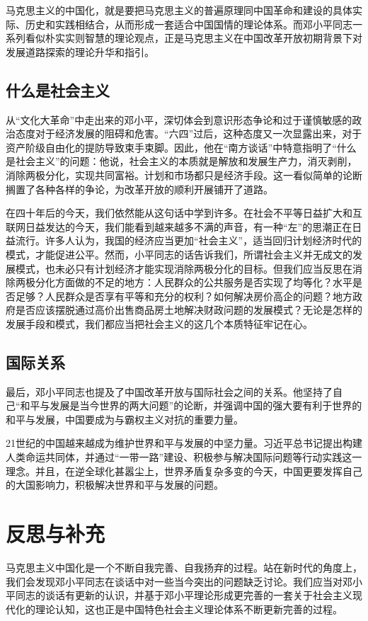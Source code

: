 \documentclass[12pt]{article}
\begin{document}
马克思主义的中国化，就是要把马克思主义的普遍原理同中国革命和建设的具体实际、历史和实践相结合，从而形成一套适合中国国情的理论体系。而邓小平同志一系列看似朴实实则智慧的理论观点，正是马克思主义在中国改革开放初期背景下对发展道路探索的理论升华和指引。

\subsection{什么是社会主义}
从“文化大革命”中走出来的邓小平，深切体会到意识形态争论和过于谨慎敏感的政治态度对于经济发展的阻碍和危害。“六四”过后，这种态度又一次显露出来，对于资产阶级自由化的提防导致束手束脚。因此，他在“南方谈话”中特意指明了“什么是社会主义”的问题：他说，社会主义的本质就是解放和发展生产力，消灭剥削，消除两极分化，实现共同富裕。计划和市场都只是经济手段。这一看似简单的论断搁置了各种各样的争论，为改革开放的顺利开展铺开了道路。

在四十年后的今天，我们依然能从这句话中学到许多。在社会不平等日益扩大和互联网日益发达的今天，我们能看到越来越多不满的声音，有一种“左”的思潮正在日益流行。许多人认为，我国的经济应当更加“社会主义”，适当回归计划经济时代的模式，才能促进公平。然而，小平同志的话告诉我们，所谓社会主义并无成文的发展模式，也未必只有计划经济才能实现消除两极分化的目标。但我们应当反思在消除两极分化方面做的不足的地方：人民群众的公共服务是否实现了均等化？水平是否足够？人民群众是否享有平等和充分的权利？如何解决房价高企的问题？地方政府是否应该摆脱通过高价出售商品房土地解决财政问题的发展模式？无论是怎样的发展手段和模式，我们都应当把社会主义的这几个本质特征牢记在心。

\subsection{国际关系}
最后，邓小平同志也提及了中国改革开放与国际社会之间的关系。他坚持了自己“和平与发展是当今世界的两大问题”的论断，并强调中国的强大要有利于世界的和平与发展，中国要成为与霸权主义对抗的重要力量。

21世纪的中国越来越成为维护世界和平与发展的中坚力量。习近平总书记提出构建人类命运共同体，并通过“一带一路”建设、积极参与解决国际问题等行动实践这一理念。并且，在逆全球化甚嚣尘上，世界矛盾复杂多变的今天，中国更要发挥自己的大国影响力，积极解决世界和平与发展的问题。

\section{反思与补充}
马克思主义中国化是一个不断自我完善、自我扬弃的过程。站在新时代的角度上，我们会发现邓小平同志在谈话中对一些当今突出的问题缺乏讨论。我们应当对邓小平同志的谈话有更新的认识，并基于邓小平理论形成更完善的一套关于社会主义现代化的理论认知，这也正是中国特色社会主义理论体系不断更新完善的过程。
\end{document}
